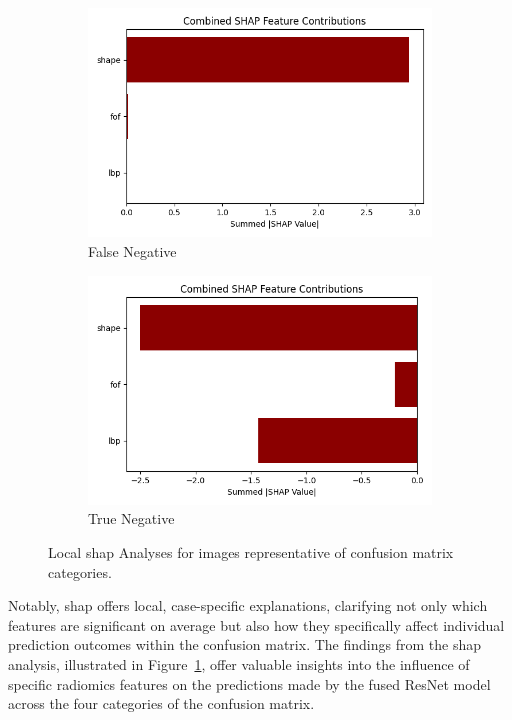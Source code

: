 \begin{figure}[htbp]
\begin{subfigure}[b]{0.45\textwidth}
        \includegraphics[width=\linewidth]{figures/shap/false_negative/combined_shap_summary.png}
        \caption{False Negative}
    \end{subfigure}
    \begin{subfigure}[b]{0.45\textwidth}
        \centering
        \includegraphics[width=\linewidth]{figures/shap/true_negative/combined_shap_summary.png}
        \caption{True Negative}
    \end{subfigure}
    \caption[Local SHAP Analyses]{Local \ac{shap} Analyses for images representative of confusion matrix categories.}
    \label{fig:shap_analysis}
\end{figure}

Notably, \ac{shap} offers local, case-specific explanations, clarifying not only which features are significant on average but also how they specifically affect individual prediction outcomes within the confusion matrix.
The findings from the \ac{shap} analysis, illustrated in Figure~\ref{fig:shap_analysis}, offer valuable insights into the influence of specific radiomics features on the predictions made by the fused ResNet model across the four categories of the confusion matrix.

